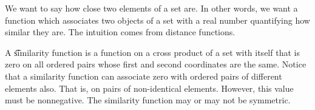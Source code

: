

We want to say how close two elements of a set are.
In other words, we want a function which associates two objects of a set with a real number quantifying how similar they are.
The intuition comes from distance functions.


A \t{similarity function} is a function on a cross product of a set with itself that is zero on all ordered pairs whose first and second coordinates are the same.
Notice that a similarity function can associate zero with ordered pairs of different elements also.
That is, on pairs of non-identical elements.
However, this value must be nonnegative.
The similarity function may or may not be symmetric.
